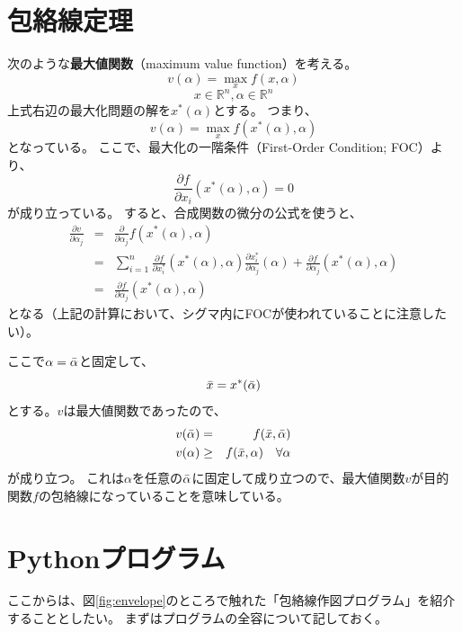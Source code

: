\documentclass[11pt,a4j]{jarticle}
\begin{document}
\section{包絡線定理}
次のような\textbf{最大値関数}（maximum value function）を考える。
\[ v(\alpha)=\max_{x}f(x,\alpha) \]
\[ x\in \mathbb{R}^{n} ,\alpha \in \mathbb{R}^{n}\]
上式右辺の最大化問題の解を$x^{*}(\alpha)$とする。
つまり、
\[ v(\alpha)=\max_{x}f(x^{*}(\alpha),\alpha) \]
となっている。
ここで、最大化の一階条件（First-Order Condition; FOC）より、
\[ \frac{\partial f}{\partial x_{i}}(x^{*}(\alpha),\alpha) = 0 \]
が成り立っている。
すると、合成関数の微分の公式を使うと、
\begin{eqnarray*}
 \frac{\partial v}{\partial \alpha_{j}}&=&\frac{\partial}{\partial \alpha_{j}}f(x^{*}(\alpha),\alpha)\\
 &=&\sum^n_{i=1}\frac{\partial f}{\partial x^{*}_{i}}(x^{*}(\alpha),\alpha)\frac{\partial x^{*}_{i}}{\partial \alpha_{j}}(\alpha)+\frac{\partial f}{\partial \alpha_{j}}(x^{*}(\alpha),\alpha)\\
 &=&\frac{\partial f}{\partial \alpha_{j}}(x^{*}(\alpha),\alpha)
\end{eqnarray*}
となる（上記の計算において、シグマ内にFOCが使われていることに注意したい）。

ここで$\alpha=\Bar{\alpha}$と固定して、
\[ \Bar{x} = x^{*}(\Bar{\alpha}) \]
とする。$v$は最大値関数であったので、
\begin{eqnarray*}
 v(\Bar{\alpha}) &=& f(\Bar{x},\Bar{\alpha})\\
 v(\alpha) &\geq& f(\Bar{x},\alpha) \quad \forall\alpha
\end{eqnarray*}
が成り立つ。
これは$\alpha$を任意の$\Bar{\alpha}$に固定して成り立つので、最大値関数$v$が目的関数$f$の包絡線になっていることを意味している。


\section{Pythonプログラム}
ここからは、図\ref{fig:envelope}のところで触れた「包絡線作図プログラム」を紹介することとしたい。
まずはプログラムの全容について記しておく。
\end{document}
